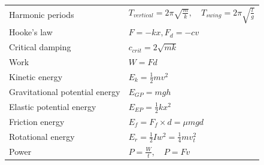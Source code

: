 \begin{tabular}{|l|l|}
    Harmonic periods                  & $T_{vertical} = 2\pi\sqrt{\frac{m}{k}},\quad T_{swing} = 2\pi\sqrt{\frac{l}{g}}$        \\
    Hooke's law                       & $F=-kx,F_d=-cv$                                                                         \\
    Critical damping                  & $c_{crit}=2\sqrt{mk}$                                                                   \\
    Work                              & $W=Fd$                                                                                  \\
    Kinetic energy                    & $E_k=\frac{1}{2}mv^2$                                                                   \\
    Gravitational potential energy    & $E_{GP}=mgh$                                                                            \\
    Elastic potential energy          & $E_{EP}=\frac{1}{2}kx^2$                                                                \\
    Friction energy                   & $E_{f}=F_f\times d=\mu mgd$                                                             \\
    Rotational energy                 & $E_{r}=\frac{1}{2}Iw^2=\frac14mv_t^2$                                                   \\
    Power                             & $P=\frac{W}{t},\quad P=Fv$                                                              \\\hline
\end{tabular}
